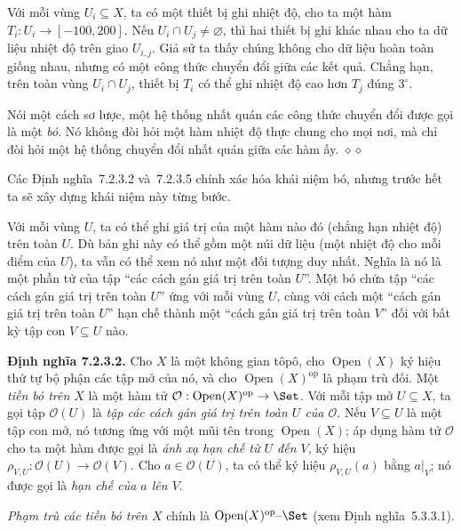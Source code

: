 Với mỗi vùng $U_i\subseteq X$, ta có một thiết bị ghi nhiệt độ, cho ta một hàm $T_i:U_i\to[-100,200]$. Nếu $U_i\cap U_j\ne\varnothing$, thì hai thiết bị ghi khác nhau cho ta dữ liệu nhiệt độ trên giao $U_{i,j}$. Giả sử ta thấy chúng không cho dữ liệu hoàn toàn giống nhau, nhưng có một công thức chuyển đổi giữa các kết quả. Chẳng hạn, trên toàn vùng $U_i\cap U_j$, thiết bị $T_i$ có thể ghi nhiệt độ cao hơn $T_j$ đúng $3^\circ$.

Nói một cách sơ lược, một hệ thống nhất quán các công thức chuyển đổi được gọi là một \emph{bó}. Nó không đòi hỏi một hàm nhiệt độ thực chung cho mọi nơi, mà chỉ đòi hỏi một hệ thống chuyển đổi nhất quán giữa các hàm ấy.
\hfill$\diamond\diamond$

Các Định nghĩa~7.2.3.2 và~7.2.3.5 chính xác hóa khái niệm bó, nhưng trước hết ta sẽ xây dựng khái niệm này từng bước.

Với mỗi vùng $U$, ta có thể ghi giá trị của một hàm nào đó (chẳng hạn nhiệt độ) trên toàn $U$. Dù bản ghi này có thể gồm một núi dữ liệu (một nhiệt độ cho mỗi điểm của $U$), ta vẫn có thể xem nó như một đối tượng duy nhất. Nghĩa là nó là một phần tử của tập ``các cách gán giá trị trên toàn $U$''. Một bó chứa tập ``các cách gán giá trị trên toàn $U$'' ứng với mỗi vùng $U$, cùng với cách một ``cách gán giá trị trên toàn $U$'' hạn chế thành một ``cách gán giá trị trên toàn $V$'' đối với bất kỳ tập con $V\subseteq U$ nào.

\noindent\textbf{Định nghĩa 7.2.3.2.}\keepwithnext
Cho $X$ là một không gian tôpô, cho $\operatorname{Open}(X)$ ký hiệu thứ tự bộ phận các tập mở của nó, và cho $\operatorname{Open}(X)^{\mathrm{op}}$ là phạm trù đối. Một \emph{tiền bó trên $X$} là một hàm tử $\mathcal O:\operatorname{Open}(X)^{\mathrm{op}}\to\Set$. Với mỗi tập mở $U\subseteq X$, ta gọi tập $\mathcal O(U)$ là \emph{tập các cách gán giá trị trên toàn $U$ của $\mathcal O$}. Nếu $V\subseteq U$ là một tập con mở, nó tương ứng với một mũi tên trong $\operatorname{Open}(X)$; áp dụng hàm tử $\mathcal O$ cho ta một hàm được gọi là \emph{ánh xạ hạn chế từ $U$ đến $V$}, ký hiệu $\rho_{V,U}:\mathcal O(U)\to\mathcal O(V)$. Cho $a\in\mathcal O(U)$, ta có thể ký hiệu $\rho_{V,U}(a)$ bằng $a|_V$; nó được gọi là \emph{hạn chế của $a$ lên $V$}.

\emph{Phạm trù các tiền bó trên $X$} chính là $\operatorname{Open}(X)^{\mathrm{op}}\text{--}\Set$ (xem Định nghĩa~5.3.3.1).

